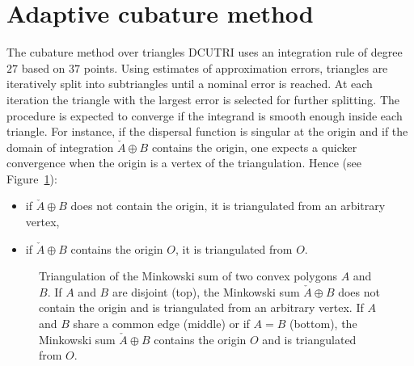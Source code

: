 \section{Adaptive cubature method}
\label{sec:cubature}

The cubature method over triangles DCUTRI \cite{berntsen_espelid} uses
an integration rule of degree $27$ based on $37$ points. Using
estimates of approximation errors, triangles are iteratively split
into subtriangles until a nominal error is reached. At each iteration
the triangle with the largest error is selected for further splitting.
The procedure is expected to converge if the integrand is smooth
enough inside each triangle. For instance, if the dispersal function
is singular at the origin and if the domain of integration
$\check{A}\oplus B$ contains the origin, one expects a quicker
convergence when the origin is a vertex of the triangulation. Hence
(see Figure~\ref{fig:triangulation:minkowski}):
\begin{itemize}
\item if $\check{A}\oplus B$ does not contain the origin, it is
  triangulated from an arbitrary vertex,
\item if $\check{A}\oplus B$ contains the origin $O$, it is
  triangulated from $O$.
\end{itemize}

\begin{figure}[htbp]
  \centering
  
  \caption{Triangulation of the Minkowski sum of two convex polygons
    $A$ and $B$. If $A$ and $B$ are disjoint (top), the Minkowski sum
    $\check{A}\oplus B$ does not contain the origin and is
    triangulated from an arbitrary vertex. If $A$ and $B$ share a
    common edge (middle) or if $A=B$ (bottom), the Minkowski sum
    $\check{A}\oplus B$ contains the origin $O$ and is
    triangulated from $O$.}
  \label{fig:triangulation:minkowski}
\end{figure}

